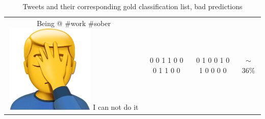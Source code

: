 \begin{table}[h]
\begin{tabular}{c|c|c|c|}
\parbox[t]{6cm}{Being @ \#work \#sober \includegraphics[scale=0.07]{pictures/man_facepalm_emoji.png}
 I can not do it} & 0 0 1 1 0 0 0 1 1 0 0 & 0 1 0 0 1 0 1 0 0 0 0 & $\sim$ 36\% \\
\end{tabular}
\caption{Tweets and their corresponding gold classification list, bad predictions}
\label{tab:classerrorhigh}
\end{table}\\

